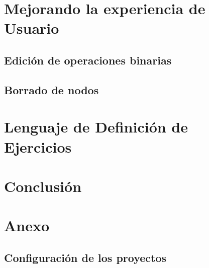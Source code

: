 \section{Mejorando la experiencia de Usuario}

\subsection{Edición de operaciones binarias}
\subsection{Borrado de nodos}

\section{Lenguaje de Definición de Ejercicios}

\section{Conclusión}

\section{Anexo}
\subsection{Configuración de los proyectos}



